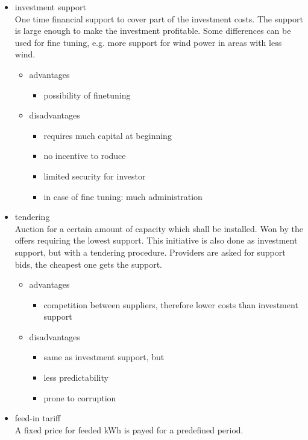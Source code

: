 \documentclass{article}
\begin{document}
\begin{itemize}
\item investment support\\
One time financial support to cover part of the investment costs.  The support is large enough to make the investment profitable. Some differences can be used for fine tuning, e.g. more support for wind power in areas with less wind.
\begin{itemize}
\item advantages
\begin{itemize}
\item possibility of finetuning
\end{itemize}
\item disadvantages
\begin{itemize}
\item requires much capital at beginning
\item no incentive to roduce
\item limited security for investor
\item in case of fine tuning: much administration
\end{itemize}
\end{itemize}
\item tendering\\
Auction for a certain amount of capacity which shall be installed. Won by the offers requiring the lowest support. This initiative is also done as investment support, but with a tendering procedure. Providers are asked for support bids, the cheapest one gets the support.
\begin{itemize}
\item advantages
\begin{itemize}
\item competition between suppliers, therefore lower costs than investment support
\end{itemize}
\item disadvantages
\begin{itemize}
\item same as investment support, but
\item less predictability
\item prone to corruption
\end{itemize}
\end{itemize}
\item feed-in tariff\\
A fixed price for feeded kWh is payed for a predefined period.
\begin{itemize}

\end{itemize}
\end{itemize}
\end{document}

